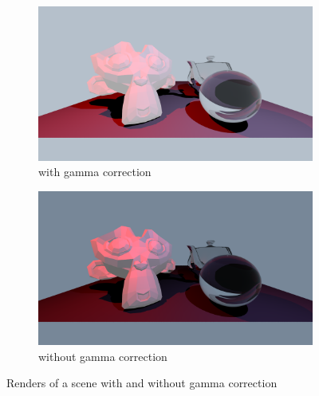 \documentclass{article}
\begin{document}
\begin{figure}[h]
	\centering
	\begin{subfigure}{0.45\textwidth}
		\includegraphics[width=\textwidth]{scene_with_gamma}
		\caption{with gamma correction}
		\label{fig:with_gamma}
	\end{subfigure}%
	\hfill
	\begin{subfigure}{0.45\textwidth}
		\includegraphics[width=\textwidth]{scene_without_gamma}
		\caption{without gamma correction}
		\label{fig:without_gamma}
	\end{subfigure}
	
	\caption{Renders of a scene with and without gamma correction}
	\label{fig:gamma_correction}
\end{figure}
\end{document}
